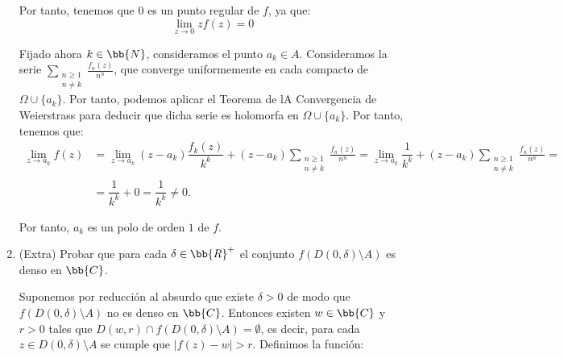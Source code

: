 \documentclass[12pt]{article}
\begin{document}
\begin{ejercicio}[2.5 puntos]
\begin{enumerate}
            Por tanto, tenemos que $0$ es un punto regular de $f$, ya que:
            \begin{equation*}
                \lim_{z\to 0} zf(z) = 0
            \end{equation*}

            Fijado ahora $k\in \bb{N}$, consideramos el punto $a_k\in A$. Consideramos la serie $\sum\limits_{\substack{n\geq 1\\n\neq k}} \frac{f_n(z)}{n^n}$, que converge uniformemente en cada compacto de $\Omega\cup\{a_k\}$. Por tanto, podemos aplicar el Teorema de lA Convergencia de Weierstrass para deducir que dicha serie es holomorfa en $\Omega\cup\{a_k\}$. Por tanto, tenemos que:
            \begin{align*}
                \lim_{z\to a_k} f(z) &= \lim_{z\to a_k} (z-a_k) \dfrac{f_k(z)}{k^k} + (z-a_k) \sum_{\substack{n\geq 1\\n\neq k}} \frac{f_n(z)}{n^n} = \lim_{z\to a_k} \dfrac{1}{k^k} + (z-a_k) \sum_{\substack{n\geq 1\\n\neq k}} \frac{f_n(z)}{n^n} =\\&= \dfrac{1}{k^k} + 0 = \dfrac{1}{k^k}\neq 0.
            \end{align*}

            Por tanto, $a_k$ es un polo de orden $1$ de $f$.

            \item (Extra) Probar que para cada $\delta\in \bb{R}^+$ el conjunto $f\left(D(0,\delta)\setminus A\right)$ es denso en $\bb{C}$.
            
            Suponemos por reducción al absurdo que existe $\delta > 0$ de modo que $f\left(D(0, \delta) \setminus A\right)$ no es denso en $\bb{C}$. Entonces existen $w \in \bb{C}$ y $r > 0$ tales que $D(w, r)\cap f\left(D(0, \delta)\setminus A\right) = \emptyset$, es decir, para cada $z \in D(0, \delta) \setminus A$ se cumple que $|f(z) - w| > r$. Definimos la función:


\end{enumerate}
\end{ejercicio}
\end{document}
